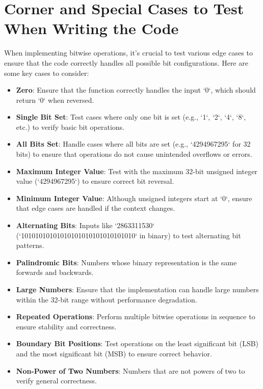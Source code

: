 \section*{Corner and Special Cases to Test When Writing the Code}

When implementing bitwise operations, it's crucial to test various edge cases to ensure that the code correctly handles all possible bit configurations. Here are some key cases to consider:

\begin{itemize}
    \item \textbf{Zero}: Ensure that the function correctly handles the input `0`, which should return `0` when reversed.
    
    \item \textbf{Single Bit Set}: Test cases where only one bit is set (e.g., `1`, `2`, `4`, `8`, etc.) to verify basic bit operations.
    
    \item \textbf{All Bits Set}: Handle cases where all bits are set (e.g., `4294967295` for 32 bits) to ensure that operations do not cause unintended overflows or errors.
    
    \item \textbf{Maximum Integer Value}: Test with the maximum 32-bit unsigned integer value (`4294967295`) to ensure correct bit reversal.
    
    \item \textbf{Minimum Integer Value}: Although unsigned integers start at `0`, ensure that edge cases are handled if the context changes.
    
    \item \textbf{Alternating Bits}: Inputs like `2863311530` (`10101010101010101010101010101010` in binary) to test alternating bit patterns.
    
    \item \textbf{Palindromic Bits}: Numbers whose binary representation is the same forwards and backwards.
    
    \item \textbf{Large Numbers}: Ensure that the implementation can handle large numbers within the 32-bit range without performance degradation.
    
    \item \textbf{Repeated Operations}: Perform multiple bitwise operations in sequence to ensure stability and correctness.
    
    \item \textbf{Boundary Bit Positions}: Test operations on the least significant bit (LSB) and the most significant bit (MSB) to ensure correct behavior.
    
    \item \textbf{Non-Power of Two Numbers}: Numbers that are not powers of two to verify general correctness.
\end{itemize}

